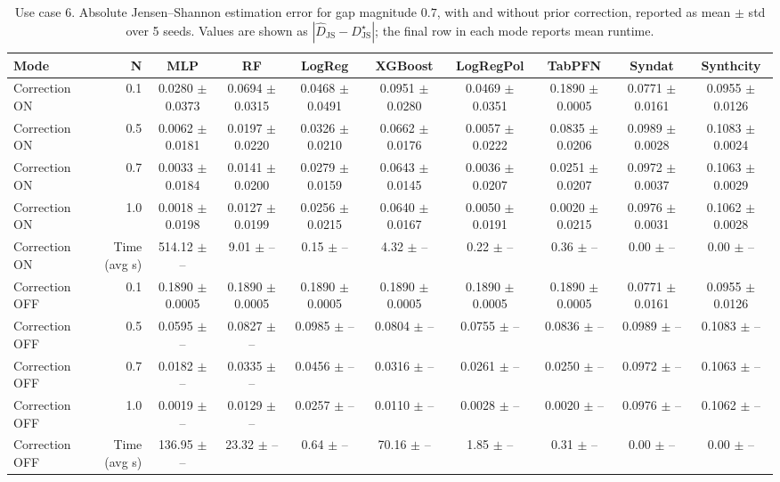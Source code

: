\begin{table}[ht]
\centering
\small
\setlength{\tabcolsep}{3pt}
\caption{Use case 6. Absolute Jensen--Shannon estimation error for gap magnitude $0.7$, with and without prior correction, reported as mean $\pm$ std over 5 seeds. Values are shown as $|\widehat{D}_{\mathrm{JS}} - D_{\mathrm{JS}}^{\star}|$; the final row in each mode reports mean runtime.}
\label{tab:uc6_gap_0p7_on_off_mean_std}
\begin{tabular}{lrcccccccc}
\toprule
Mode & N & MLP & RF & LogReg & XGBoost & LogRegPol & TabPFN & Syndat & Synthcity \\
\midrule
Correction ON & 0.1 & 0.0280 $\pm$ 0.0373 & 0.0694 $\pm$ 0.0315 & 0.0468 $\pm$ 0.0491 & 0.0951 $\pm$ 0.0280 & 0.0469 $\pm$ 0.0351 & 0.1890 $\pm$ 0.0005 & 0.0771 $\pm$ 0.0161 & 0.0955 $\pm$ 0.0126 \\
Correction ON & 0.5 & 0.0062 $\pm$ 0.0181 & 0.0197 $\pm$ 0.0220 & 0.0326 $\pm$ 0.0210 & 0.0662 $\pm$ 0.0176 & 0.0057 $\pm$ 0.0222 & 0.0835 $\pm$ 0.0206 & 0.0989 $\pm$ 0.0028 & 0.1083 $\pm$ 0.0024 \\
Correction ON & 0.7 & 0.0033 $\pm$ 0.0184 & 0.0141 $\pm$ 0.0200 & 0.0279 $\pm$ 0.0159 & 0.0643 $\pm$ 0.0145 & 0.0036 $\pm$ 0.0207 & 0.0251 $\pm$ 0.0207 & 0.0972 $\pm$ 0.0037 & 0.1063 $\pm$ 0.0029 \\
Correction ON & 1.0 & 0.0018 $\pm$ 0.0198 & 0.0127 $\pm$ 0.0199 & 0.0256 $\pm$ 0.0215 & 0.0640 $\pm$ 0.0167 & 0.0050 $\pm$ 0.0191 & 0.0020 $\pm$ 0.0215 & 0.0976 $\pm$ 0.0031 & 0.1062 $\pm$ 0.0028 \\
Correction ON & Time (avg s) & 514.12 $\pm$ -- & 9.01 $\pm$ -- & 0.15 $\pm$ -- & 4.32 $\pm$ -- & 0.22 $\pm$ -- & 0.36 $\pm$ -- & 0.00 $\pm$ -- & 0.00 $\pm$ -- \\
Correction OFF & 0.1 & 0.1890 $\pm$ 0.0005 & 0.1890 $\pm$ 0.0005 & 0.1890 $\pm$ 0.0005 & 0.1890 $\pm$ 0.0005 & 0.1890 $\pm$ 0.0005 & 0.1890 $\pm$ 0.0005 & 0.0771 $\pm$ 0.0161 & 0.0955 $\pm$ 0.0126 \\
Correction OFF & 0.5 & 0.0595 $\pm$ -- & 0.0827 $\pm$ -- & 0.0985 $\pm$ -- & 0.0804 $\pm$ -- & 0.0755 $\pm$ -- & 0.0836 $\pm$ -- & 0.0989 $\pm$ -- & 0.1083 $\pm$ -- \\
Correction OFF & 0.7 & 0.0182 $\pm$ -- & 0.0335 $\pm$ -- & 0.0456 $\pm$ -- & 0.0316 $\pm$ -- & 0.0261 $\pm$ -- & 0.0250 $\pm$ -- & 0.0972 $\pm$ -- & 0.1063 $\pm$ -- \\
Correction OFF & 1.0 & 0.0019 $\pm$ -- & 0.0129 $\pm$ -- & 0.0257 $\pm$ -- & 0.0110 $\pm$ -- & 0.0028 $\pm$ -- & 0.0020 $\pm$ -- & 0.0976 $\pm$ -- & 0.1062 $\pm$ -- \\
Correction OFF & Time (avg s) & 136.95 $\pm$ -- & 23.32 $\pm$ -- & 0.64 $\pm$ -- & 70.16 $\pm$ -- & 1.85 $\pm$ -- & 0.31 $\pm$ -- & 0.00 $\pm$ -- & 0.00 $\pm$ -- \\
\bottomrule
\end{tabular}
\end{table}